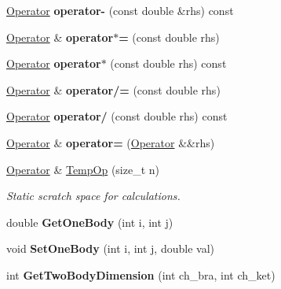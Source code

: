 \begin{DoxyCompactItemize}
\hyperlink{classOperator}{Operator} {\bfseries operator-\/} (const double \&rhs) const
\item 
\mbox{\label{classOperator_a9398ce826d8ef57e69a1aa776734080f}} 
\hyperlink{classOperator}{Operator} \& {\bfseries operator$\ast$=} (const double rhs)
\item 
\mbox{\label{classOperator_a7b8662958e3ed785892d55085675485b}} 
\hyperlink{classOperator}{Operator} {\bfseries operator$\ast$} (const double rhs) const
\item 
\mbox{\label{classOperator_a53af250702ec7c48de5397b209ebc09e}} 
\hyperlink{classOperator}{Operator} \& {\bfseries operator/=} (const double rhs)
\item 
\mbox{\label{classOperator_a9628ecc3fd51635cbf1e9cf8f5814f6d}} 
\hyperlink{classOperator}{Operator} {\bfseries operator/} (const double rhs) const
\item 
\mbox{\label{classOperator_ab1d24f45c7e10139e41084c8dc7f34ec}} 
\hyperlink{classOperator}{Operator} \& {\bfseries operator=} (\hyperlink{classOperator}{Operator} \&\&rhs)
\item 
\mbox{\label{classOperator_a868fc1cfa77af585baaefe7cbd7d76e5}} 
\hyperlink{classOperator}{Operator} \& \hyperlink{classOperator_a868fc1cfa77af585baaefe7cbd7d76e5}{Temp\+Op} (size\+\_\+t n)
\begin{DoxyCompactList}\small\item\em Static scratch space for calculations. \end{DoxyCompactList}\item 
\mbox{\label{classOperator_a34eb5fa0e6d415cd44e1a3034d1cf5c0}} 
double {\bfseries Get\+One\+Body} (int i, int j)
\item 
\mbox{\label{classOperator_ae85aa3d8fdaeb3cb6266c3a4494e904b}} 
void {\bfseries Set\+One\+Body} (int i, int j, double val)
\item 
\mbox{\label{classOperator_aa2b42d5c6afffc790b9a7466787d7237}} 
int {\bfseries Get\+Two\+Body\+Dimension} (int ch\+\_\+bra, int ch\+\_\+ket)

\end{DoxyCompactItemize}
